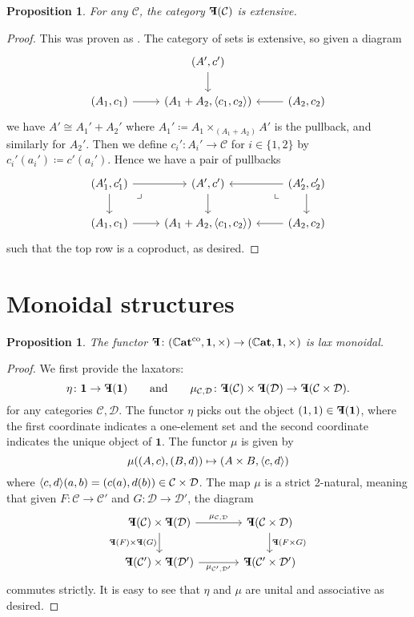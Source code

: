 \documentclass[11pt, one side, article]{memoir}
\theoremstyle{definition}
\theoremstyle{plain}
\newtheorem{proposition}[definitionx]{Proposition}
\DeclarePairedDelimiter{\pair}{\langle}{\rangle}
\newcommand{\cat}[1]{\mathcal{#1}}%
\newcommand{\Cat}[1]{\mathbf{#1}}%
\newcommand{\co}{^\tn{co}}
\newcommand{\tn}[1]{\textnormal{#1}}
\newcommand{\smcat}{\mathbb{C}\Cat{at}}
\newcommand{\0}{\Cat{0}}
\newcommand{\1}{\Cat{1}}
\newcommand{\mn}{\reflectbox{$\Cat{F}$}}
\newcommand{\qqand}{\qquad\text{and}\qquad}
\begin{document}
\begin{proposition}
For any $\cat{C}$, the category $\mn(\cat{C})$ is extensive.
\end{proposition}
\begin{proof}
This was proven as \cite[Proposition 2.4]{carboni1993introduction}. The category of sets is extensive, so given a diagram
\[
\begin{tikzcd}
	&(A',c')\ar[d]\\
	(A_1,c_1)\ar[r]&(A_1+A_2,\pair{c_1,c_2})&(A_2,c_2)\ar[l]
\end{tikzcd}
\]
we have $A'\cong A_1'+A_2'$ where $A_1'\coloneqq A_1\times_{(A_1+A_2)}A'$ is the pullback, and similarly for $A_2'$. Then we define $c_i'\colon A_i'\to \cat{C}$ for $i\in\{1,2\}$ by $c_i'(a_i')\coloneqq c'(a_i')$.
 Hence we have a pair of pullbacks
\[
\begin{tikzcd}
	(A'_1,c'_1)\ar[r]\ar[d]\ar[dr, phantom, very near start, "\lrcorner"]&
	(A',c')\ar[d]&
	(A'_2,c'_2)\ar[l]\ar[d]\ar[dl, phantom, very near start, "\llcorner"]
	\\
	(A_1,c_1)\ar[r]&(A_1+A_2,\pair{c_1,c_2})&(A_2,c_2)\ar[l]
\end{tikzcd}
\]
such that the top row is a coproduct, as desired.
\end{proof}




\section{Monoidal structures}

\begin{proposition}
The functor $\mn\colon(\smcat\co,\1,\times)\to(\smcat,\1,\times)$ is lax monoidal.
\end{proposition}
\begin{proof}
We first provide the laxators:
\[
  \eta\colon \1\to\mn(\1)
  \qqand
  \mu_{\cat{C},\cat{D}}\colon\mn(\cat{C})\times\mn(\cat{D})\to\mn(\cat{C}\times\cat{D}).
\]
for any categories $\cat{C},\cat{D}$. The functor $\eta$ picks out the object $(1,1)\in\mn(\1)$, where the first coordinate indicates a one-element set and the second coordinate indicates the unique object of $\1$. The functor $\mu$ is given by
\[
\mu((A,c),(B,d))\mapsto(A\times B, \pair{c,d})
\]
where $\pair{c,d}(a,b)=(c(a),d(b))\in\cat{C}\times\cat{D}$. The map $\mu$ is a strict 2-natural, meaning that given $F\colon\cat{C}\to\cat{C}'$ and $G\colon\cat{D}\to\cat{D}'$, the diagram
\[
\begin{tikzcd}[column sep=large]
	\mn(\cat{C})\times\mn(\cat{D})\ar[r, "\mu_{\cat{C},\cat{D}}"]\ar[d, "\mn(F)\times\mn(G)"']&
	\mn(\cat{C}\times\cat{D})\ar[d, "\mn(F\times G)"]\\
	\mn(\cat{C}')\times\mn(\cat{D}')\ar[r, "\mu_{\cat{C'},\cat{D'}}"']&
	\mn(\cat{C}'\times\cat{D}')
\end{tikzcd}
\]
commutes strictly. It is easy to see that $\eta$ and $\mu$ are unital and associative as desired.
\end{proof}
\end{document}
